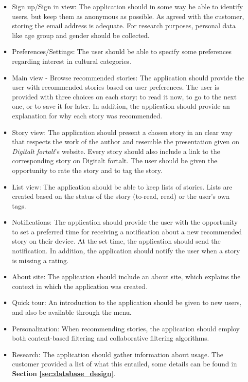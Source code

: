 \begin{itemize}
	\item Sign up/Sign in view: The application should in some way be able to identify users, but keep them as anonymous as possible. As agreed with the customer, storing the email address is adequate. For research purposes, personal data like age group and gender should be collected.
	
	\item Preferences/Settings: The user should be able to specify some preferences regarding interest in cultural categories.
	
	\item Main view - Browse recommended stories: The application should provide the user with recommended stories based on user preferences. The user is provided with three choices on each story: to read it now, to go to the next one, or to save it for later. In addition, the application should provide an explanation for why each story was recommended.
	
	\item Story view: The application should present a chosen story in an clear way that respects the work of the author and resemble the presentation given on \textit{Digitalt fortalt}'s website. Every story should also include a link to the corresponding story on Digitalt fortalt. The user should be given the opportunity to rate the story and to tag the story. 
	
	\item List view: The application should be able to keep lists of stories. Lists are created based on the status of the story (to-read, read) or the user's own tags.
	
	\item Notifications: The application should provide the user with the opportunity to set a preferred time for receiving a notification about a new recommended story on their device. At the set time, the application should send the notification. In addition, the application should notify the user when a story is missing a rating.
	
	\item About site: The application should include an about site, which explains the context in which the application was created.
	
	\item Quick tour: An introduction to the application should be given to new users, and also be available through the menu.  
	
	\item Personalization: When recommending stories, the application should employ both content-based filtering and collaborative filtering algorithms.
	
	\item Research: The application should gather information about usage. The customer provided a list of what this entailed, some details can be found in \textbf{Section \ref{sec:database_design}}.
\end{itemize}


